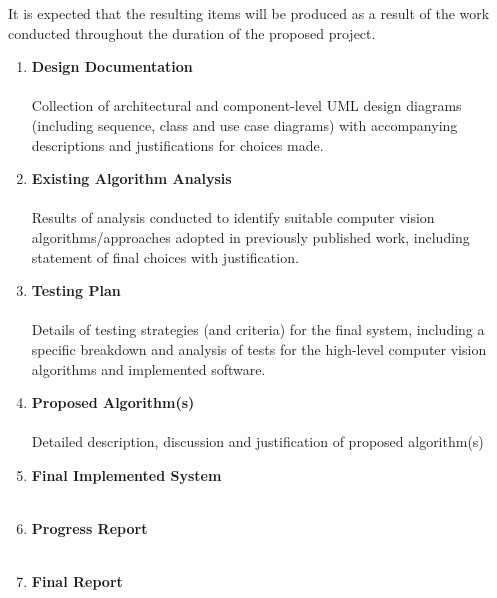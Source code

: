 \documentclass[10pt,fleqn,twoside]{article}
\begin{document}
It is expected that the resulting items will be produced as a result of the work conducted throughout the duration of the proposed project.

\begin{enumerate}

	\item \textbf{Design Documentation} \\\\ Collection of architectural and component-level UML design diagrams (including sequence, class and use case diagrams) with accompanying descriptions and justifications for choices made.

	\item \textbf{Existing Algorithm Analysis} \\\\ Results of analysis conducted to identify suitable computer vision algorithms/approaches adopted in previously published work, including statement of final choices with justification. 
	
	\item \textbf{Testing Plan} \\\\ Details of testing strategies (and criteria) for the final system, including a specific breakdown and analysis of tests for the high-level computer vision algorithms and implemented software.
	 
	\item \textbf{Proposed Algorithm(s)} \\\\  Detailed description, discussion and justification of proposed algorithm(s) 
	
	\item \textbf{Final Implemented System} \\\\ 
	
	\item \textbf{Progress Report} \\\\ 

	\item \textbf{Final Report} \\\\
		


\end{enumerate}


\nocite{*} %
\end{document}
